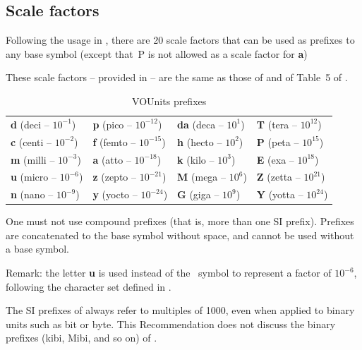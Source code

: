 \documentclass[11pt,notitlepage,onecolumn]{ivoa}
\newcommand{\unit}[1]{\textbf{\textsf{\color{orange}#1}}}
\def\micro{{\symbo \char109}}
\begin{document}
\subsection{Scale factors\label{sec:scaleFactors}}

Following the usage in , there are 20
scale factors that can be used as prefixes to any base symbol (except
that~P is not allowed as a scale factor
for \unit{a})

These scale factors -- provided in  --
 are the same as those of \citet{si-brochure} and of Table~5
 of \citet{pence10}.
\begin{table}
\begin{center}
\begin{tabular}{|l|l|l|l|}\hline
\unit{d} (deci -- $10^{-1}$)	&\unit{p} (pico -- $10^{-12}$) 	&\unit{da} (deca -- $10^{1}$)   	&\unit{T} (tera -- $10^{12}$)\\
\unit{c} (centi -- $10^{-2}$)	&\unit{f} (femto -- $10^{-15}$) &\unit{h} (hecto -- $10^{2}$) 	&\unit{P} (peta -- $10^{15}$)\\
\unit{m} (milli -- $10^{-3}$)	&\unit{a} (atto -- $10^{-18}$)  &\unit{k} (kilo -- $10^{3}$)	&\unit{E} (exa -- $10^{18}$)\\
\unit{u} (micro -- $10^{-6}$)	&\unit{z} (zepto -- $10^{-21}$) &\unit{M} (mega -- $10^{6}$) 	&\unit{Z} (zetta -- $10^{21}$)\\
\unit{n} (nano -- $10^{-9}$)	&\unit{y} (yocto -- $10^{-24}$) &\unit{G} (giga -- $10^{9}$)	&\unit{Y} (yotta -- $10^{24}$)\\\hline
\end{tabular}
\end{center}
\caption{\label{tab:vouscalefactors}VOUnits prefixes}
\end{table}


One must not use compound prefixes (that is,
more than one SI prefix). Prefixes are concatenated to the base
symbol without space, and cannot be used without a base symbol.

Remark: the letter \unit{u} is used instead of the \micro{}l to represent a factor of $10^{-6}$, 
following the character set defined in .

The SI prefixes of  always refer to
multiples of 1000, even when applied to binary units such as bit or
byte.  This Recommendation does not discuss the binary prefixes (kibi,
Mibi, and so on) of \citet[\S4]{std:iec80000-13}.
\end{document}
